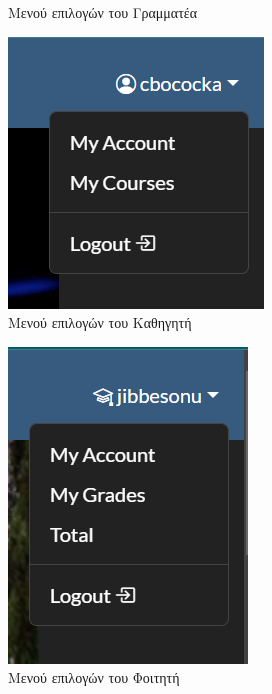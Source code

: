 \documentclass[12pt]{article}
\begin{document}
\begin{figure}[H]
\begin{subfigure}{.22\textwidth}
		\caption{Μενού επιλογών του Γραμματέα}
		\label{fig:sub22}
	\end{subfigure}
		\begin{subfigure}{.22\textwidth}
		\centering
		\includegraphics[width=.8\linewidth]{b2.png}
		\caption{Μενού επιλογών του Καθηγητή}
		\label{fig:sub23}
	\end{subfigure}
	\begin{subfigure}{.22\textwidth}
		\centering
		\includegraphics[width=.8\linewidth]{b3.png}
		\caption{Μενού επιλογών του Φοιτητή}
		\label{fig:sub24}
	\end{subfigure}
	\caption{}
	\label{fig:test1}
\end{figure}
\end{document}
